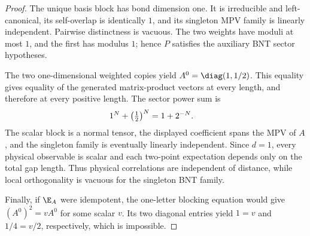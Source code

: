 \begin{proof}\leanok
    The unique basis block has bond dimension one. It is irreducible and
    left-canonical, its self-overlap is identically $1$, and its singleton MPV
    family is linearly independent. Pairwise distinctness is vacuous. The two
    weights have moduli at most $1$, and the first has modulus $1$; hence $P$
    satisfies the auxiliary BNT sector hypotheses.

    The two one-dimensional weighted copies yield
    $A^0=\diag(1,1/2)$. This equality gives equality of the generated
    matrix-product vectors at every length, and therefore at every positive
    length. The sector power sum is
    \begin{align}
        1^N+\left(\tfrac12\right)^N
         & =1+2^{-N}.
        \notag
    \end{align}
    The scalar block is a normal tensor, the displayed coefficient spans the
    MPV of $A$, and the singleton family is eventually linearly independent.
    Since $d=1$, every physical observable is scalar and each two-point
    expectation depends only on the total gap length. Thus physical
    correlations are independent of distance, while local orthogonality is
    vacuous for the singleton BNT family.

    Finally, if $\E_A$ were idempotent, the one-letter blocking equation would
    give $(A^0)^2=vA^0$ for some scalar $v$. Its two diagonal entries yield
    $1=v$ and $1/4=v/2$, respectively, which is impossible.
\end{proof}

